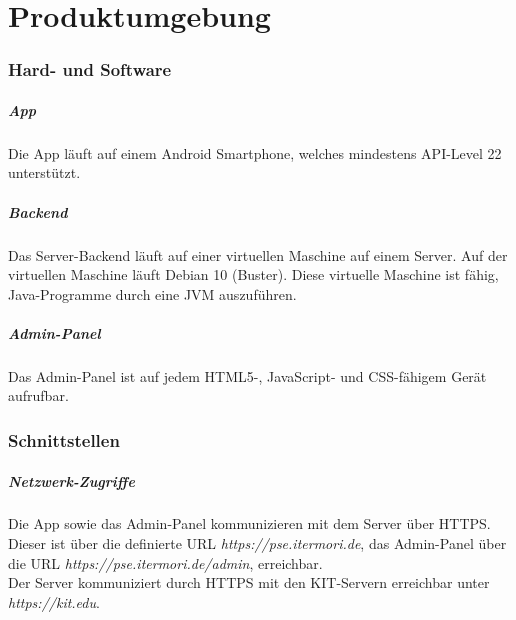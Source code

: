 \newpage
\chapter{Produktumgebung}

\subsection{Hard- und Software}
    \paragraph{App}
        Die App läuft auf einem Android Smartphone, welches mindestens API-Level 22 unterstützt.

    \paragraph{Backend}
        Das Server-Backend läuft auf einer virtuellen Maschine auf einem Server.
        Auf der virtuellen Maschine läuft Debian 10 (Buster).
        Diese virtuelle Maschine ist fähig, Java-Programme durch eine JVM auszuführen.

    \paragraph{Admin-Panel}
        Das Admin-Panel ist auf jedem HTML5-, JavaScript- und CSS-fähigem Gerät aufrufbar.

\subsection{Schnittstellen}
    \paragraph{Netzwerk-Zugriffe}
        Die App sowie das Admin-Panel kommunizieren mit dem Server über HTTPS. Dieser ist über die definierte URL \textit{https://pse.itermori.de},
        das Admin-Panel über die URL \textit{https://pse.itermori.de/admin}, erreichbar. \\
        Der Server kommuniziert durch HTTPS mit den KIT-Servern erreichbar unter \textit{https://kit.edu}.
